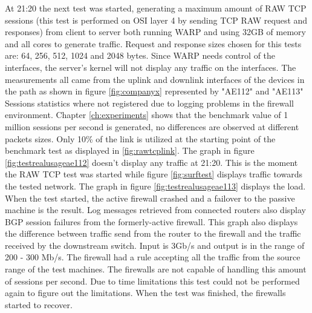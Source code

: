 At 21:20 the next test was started, generating a maximum amount of RAW TCP sessions (this test is performed on OSI layer 4 by sending TCP RAW request and responses) from client to server both running WARP and using 32GB of memory and all cores to generate traffic.
Request and response sizes chosen for this tests are: 64, 256, 512, 1024 and 2048 bytes. 
Since WARP needs control of the interfaces, the server's kernel will not display any traffic on the interfaces. 
The measurements all came from the uplink and downlink interfaces of the devices in the path as shown in figure \ref{fig:companyx} represented by "AE112" and "AE113"
Sessions statistics where not registered due to logging problems in the firewall environment. 
Chapter \ref{ch:experiments} shows that the benchmark value of 1 million sessions per second is generated, no differences are observed at different packets sizes. 
Only 10\% of the link is utilized at the starting point of the benchmark test as displayed in \ref{fig:rawtcplink}. 
The graph in figure \ref{fig:testrealusageae112} doesn't display any traffic at 21:20. This is the moment the RAW TCP test was started while figure \ref{fig:surftest} displays traffic towards the tested network. 
The graph in figure \ref{fig:testrealusageae113} displays the load. When the test started, the active firewall crashed and a failover to the passive machine is the result. Log messages retrieved from connected routers also display BGP session failures from the formerly-active firewall. 
This graph also displays the difference between traffic send from the router to the firewall and the traffic received by the downstream switch. 
Input is 3Gb/s and output is in the range of 200 - 300 Mb/s. The firewall had a rule accepting all the traffic from the source range of the test machines.
The firewalls are not capable of handling this amount of sessions per second. Due to time limitations this test could not be performed again to figure out the limitations.  
When the test was finished, the firewalls started to recover. \\ 


